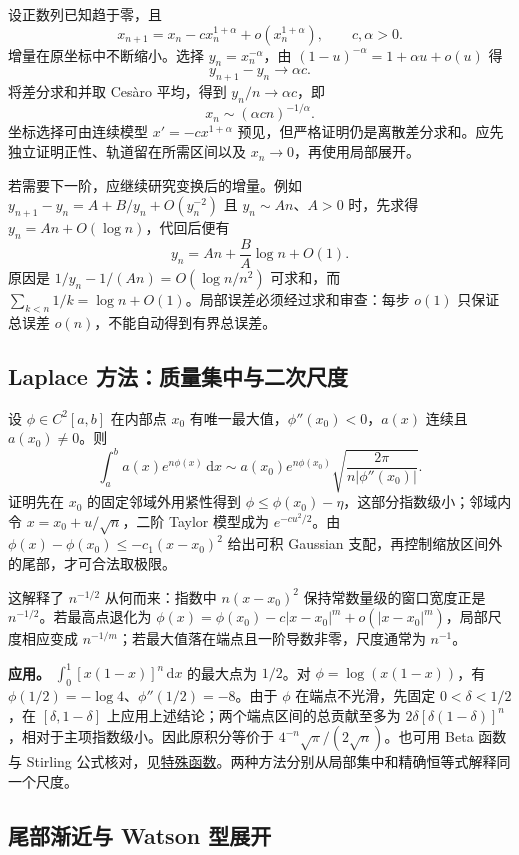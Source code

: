 \documentclass[12pt,fontset=fandol]{ctexart}
\begin{document}
\label{app:estimate-recursion}

设正数列已知趋于零，且
\[
x_{n+1}=x_n-cx_n^{1+\alpha}+o(x_n^{1+\alpha}),\qquad c,\alpha>0.
\]
增量在原坐标中不断缩小。选择 $y_n=x_n^{-\alpha}$，由 $(1-u)^{-\alpha}=1+\alpha u+o(u)$ 得
\[
y_{n+1}-y_n\longrightarrow\alpha c.
\]
将差分求和并取 Cesàro 平均，得到 $y_n/n\to\alpha c$，即
\[
x_n\sim(\alpha cn)^{-1/\alpha}.
\]
坐标选择可由连续模型 $x'=-cx^{1+\alpha}$ 预见，但严格证明仍是离散差分求和。应先独立证明正性、轨道留在所需区间以及 $x_n\to0$，再使用局部展开。

若需要下一阶，应继续研究变换后的增量。例如 $y_{n+1}-y_n=A+B/y_n+O(y_n^{-2})$ 且 $y_n\sim An$、$A>0$ 时，先求得 $y_n=An+O(\log n)$，代回后便有
\[
y_n=An+\frac BA\log n+O(1).
\]
原因是 $1/y_n-1/(An)=O(\log n/n^2)$ 可求和，而 $\sum_{k<n}1/k=\log n+O(1)$。局部误差必须经过求和审查：每步 $o(1)$ 只保证总误差 $o(n)$，不能自动得到有界总误差。

\subsection{Laplace 方法：质量集中与二次尺度}

\label{app:estimate-laplace}

设 $\phi\in C^2[a,b]$ 在内部点 $x_0$ 有唯一最大值，$\phi''(x_0)<0$，$a(x)$ 连续且 $a(x_0)\neq0$。则
\[
\int_a^ba(x)e^{n\phi(x)}\,\mathrm dx
\sim a(x_0)e^{n\phi(x_0)}
\sqrt{\frac{2\pi}{n|\phi''(x_0)|}}.
\]
证明先在 $x_0$ 的固定邻域外用紧性得到 $\phi\leq\phi(x_0)-\eta$，这部分指数级小；邻域内令 $x=x_0+u/\sqrt n$，二阶 Taylor 模型成为 $e^{-cu^2/2}$。由 $\phi(x)-\phi(x_0)\leq-c_1(x-x_0)^2$ 给出可积 Gaussian 支配，再控制缩放区间外的尾部，才可合法取极限。

这解释了 $n^{-1/2}$ 从何而来：指数中 $n(x-x_0)^2$ 保持常数量级的窗口宽度正是 $n^{-1/2}$。若最高点退化为 $\phi(x)=\phi(x_0)-c|x-x_0|^m+o(|x-x_0|^m)$，局部尺度相应变成 $n^{-1/m}$；若最大值落在端点且一阶导数非零，尺度通常为 $n^{-1}$。

\textbf{应用。} $\int_0^1[x(1-x)]^n\,\mathrm dx$ 的最大点为 $1/2$。对 $\phi=\log(x(1-x))$，有 $\phi(1/2)=-\log4$、$\phi''(1/2)=-8$。由于 $\phi$ 在端点不光滑，先固定 $0<\delta<1/2$，在 $[\delta,1-\delta]$ 上应用上述结论；两个端点区间的总贡献至多为 $2\delta[\delta(1-\delta)]^n$，相对于主项指数级小。因此原积分等价于 $4^{-n}\sqrt\pi/(2\sqrt n)$。也可用 Beta 函数与 Stirling 公式核对，见\hyperref[app:special-beta]{特殊函数}。两种方法分别从局部集中和精确恒等式解释同一个尺度。

\subsection{尾部渐近与 Watson 型展开}
\end{document}

